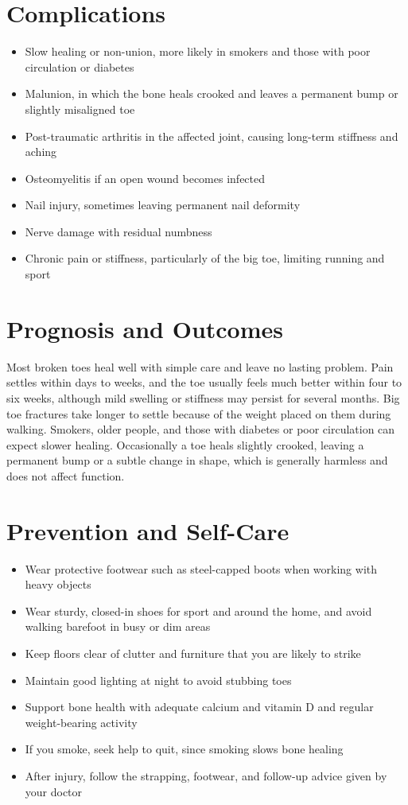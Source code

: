 \section*{Complications}
\begin{itemize}
    \item Slow healing or non-union, more likely in smokers and those with poor circulation or diabetes
    \item Malunion, in which the bone heals crooked and leaves a permanent bump or slightly misaligned toe
    \item Post-traumatic arthritis in the affected joint, causing long-term stiffness and aching
    \item Osteomyelitis if an open wound becomes infected
    \item Nail injury, sometimes leaving permanent nail deformity
    \item Nerve damage with residual numbness
    \item Chronic pain or stiffness, particularly of the big toe, limiting running and sport
\end{itemize}

\section*{Prognosis and Outcomes}
Most broken toes heal well with simple care and leave no lasting problem. Pain settles within days to weeks, and the toe usually feels much better within four to six weeks, although mild swelling or stiffness may persist for several months. Big toe fractures take longer to settle because of the weight placed on them during walking. Smokers, older people, and those with diabetes or poor circulation can expect slower healing. Occasionally a toe heals slightly crooked, leaving a permanent bump or a subtle change in shape, which is generally harmless and does not affect function.

\section*{Prevention and Self-Care}
\begin{itemize}
    \item Wear protective footwear such as steel-capped boots when working with heavy objects
    \item Wear sturdy, closed-in shoes for sport and around the home, and avoid walking barefoot in busy or dim areas
    \item Keep floors clear of clutter and furniture that you are likely to strike
    \item Maintain good lighting at night to avoid stubbing toes
    \item Support bone health with adequate calcium and vitamin D and regular weight-bearing activity
    \item If you smoke, seek help to quit, since smoking slows bone healing
    \item After injury, follow the strapping, footwear, and follow-up advice given by your doctor
\end{itemize}

